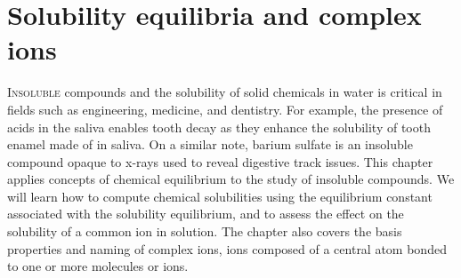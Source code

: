 \documentclass[main.tex]{subfiles}
\begin{document}
\chapter[Solubility equilibria ]{Solubility equilibria and complex ions}


\begin{marginfigure}
\end{marginfigure}



   
\lettrine[lines=4]{\color{black!45}I}{nsoluble} compounds and the solubility of solid chemicals in water is critical in fields such as engineering, medicine, and dentistry. For example, the presence of acids in the saliva enables tooth decay as they enhance the solubility of tooth enamel made of  in saliva. On a similar note, barium sulfate is an insoluble compound opaque to x-rays used to reveal digestive track issues. This chapter applies concepts of chemical equilibrium to the study of insoluble compounds. We will learn how to compute chemical solubilities using the equilibrium constant associated with the solubility equilibrium, and to assess the effect on the solubility of a common ion in solution. The chapter also covers the basis properties and naming of complex ions, ions composed of a central atom bonded to one or more molecules or ions.
\end{document}
